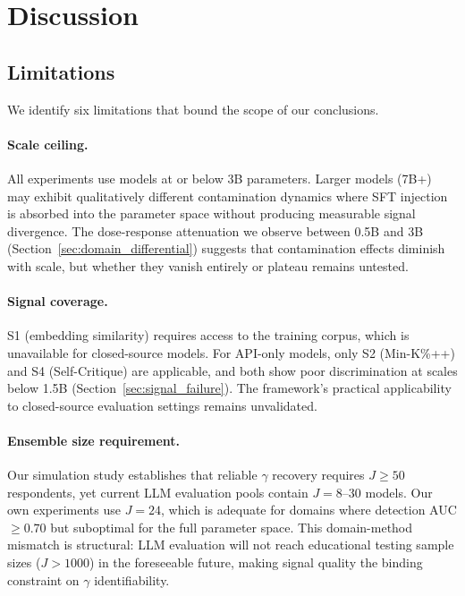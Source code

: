 \section{Discussion}
\label{sec:discussion}

\subsection{Limitations}
\label{sec:limitations}

We identify six limitations that bound the scope of our conclusions.

\paragraph{Scale ceiling.}
All experiments use models at or below 3B parameters. Larger models (7B+) may exhibit qualitatively different contamination dynamics where SFT injection is absorbed into the parameter space without producing measurable signal divergence. The dose-response attenuation we observe between 0.5B and 3B (Section~\ref{sec:domain_differential}) suggests that contamination effects diminish with scale, but whether they vanish entirely or plateau remains untested.

\paragraph{Signal coverage.}
S1 (embedding similarity) requires access to the training corpus, which is unavailable for closed-source models. For API-only models, only S2 (Min-K\%++) and S4 (Self-Critique) are applicable, and both show poor discrimination at scales below 1.5B (Section~\ref{sec:signal_failure}). The framework's practical applicability to closed-source evaluation settings remains unvalidated.

\paragraph{Ensemble size requirement.}
Our simulation study establishes that reliable $\gamma$ recovery requires $J \geq 50$ respondents, yet current LLM evaluation pools contain $J = 8$--$30$ models. Our own experiments use $J = 24$, which is adequate for domains where detection AUC $\geq 0.70$ but suboptimal for the full parameter space. This domain-method mismatch is structural: LLM evaluation will not reach educational testing sample sizes ($J > 1000$) in the foreseeable future, making signal quality the binding constraint on $\gamma$ identifiability.

